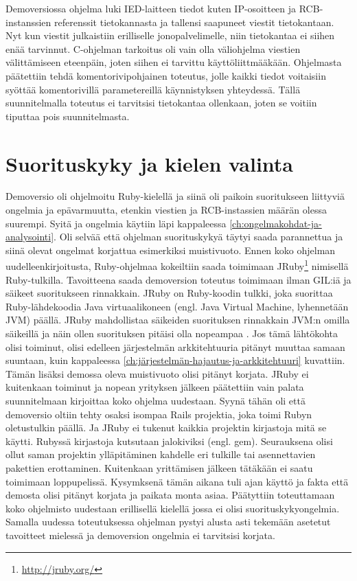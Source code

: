 Demoversiossa ohjelma luki IED-laitteen tiedot kuten IP-osoitteen ja RCB-instanssien referenssit tietokannasta ja tallensi saapuneet viestit tietokantaan. Nyt kun viestit julkaistiin erilliselle jonopalvelimelle, niin tietokantaa ei siihen enää tarvinnut. C-ohjelman tarkoitus oli vain olla väliohjelma viestien välittämiseen eteenpäin, joten siihen ei tarvittu käyttöliittmääkään. Ohjelmasta päätettiin tehdä komentorivipohjainen toteutus, jolle kaikki tiedot voitaisiin syöttää komentorivillä parametereillä käynnistyksen yhteydessä. Tällä suunnitelmalla toteutus ei tarvitsisi tietokantaa ollenkaan, joten se voitiin tiputtaa pois suunnitelmasta.


\section{Suorituskyky ja kielen valinta}
Demoversio oli ohjelmoitu Ruby-kielellä ja siinä oli paikoin suoritukseen liittyviä ongelmia ja epävarmuutta, etenkin viestien ja RCB-instassien määrän olessa suurempi. Syitä ja ongelmia käytiin läpi kappaleessa \ref{ch:ongelmakohdat-ja-analysointi}. Oli selvää että ohjelman suorituskykyä täytyi saada parannettua ja siinä olevat ongelmat korjattua esimerkiksi muistivuoto. Ennen koko ohjelman uudelleenkirjoitusta, Ruby-ohjelmaa kokeiltiin saada toimimaan JRuby\footnote{\url{http://jruby.org/}} nimisellä Ruby-tulkilla. Tavoitteena saada demoversion toteutus toimimaan ilman GIL:iä ja säikeet suoritukseen rinnakkain. JRuby on Ruby-koodin tulkki, joka suorittaa Ruby-lähdekoodia Java virtuaalikoneen (engl. Java Virtual Machine, lyhennetään JVM) päällä. JRuby mahdollistaa säikeiden suorituksen rinnakkain JVM:n omilla säikeillä ja näin ollen suorituksen pitäisi olla nopeampaa \cite{Youssef2013}. Jos tämä lähtökohta olisi toiminut, olisi edelleen järjestelmän arkkitehtuuria pitänyt muuttaa samaan suuntaan, kuin kappaleessa \ref{ch:järjestelmän-hajautus-ja-arkkitehtuuri} kuvattiin. Tämän lisäksi demossa oleva muistivuoto olisi pitänyt korjata. JRuby ei kuitenkaan toiminut ja nopean yrityksen jälkeen päätettiin vain palata suunnitelmaan kirjoittaa koko ohjelma uudestaan. Syynä tähän oli että demoversio oltiin tehty osaksi isompaa Rails projektia, joka toimi Rubyn oletustulkin päällä. Ja JRuby ei tukenut kaikkia projektin kirjastoja mitä se käytti. Rubyssä kirjastoja kutsutaan jalokiviksi (engl. gem). Seurauksena olisi ollut saman projektin ylläpitäminen kahdelle eri tulkille tai asennettavien pakettien erottaminen. Kuitenkaan yrittämisen jälkeen tätäkään ei saatu toimimaan loppupelissä. Kysymksenä tämän aikana tuli ajan käyttö ja fakta että demosta olisi pitänyt korjata ja paikata monta asiaa. Päätyttiin toteuttamaan koko ohjelmisto uudestaan erillisellä kielellä jossa ei olisi suorituskykyongelmia. Samalla uudessa toteutuksessa ohjelman pystyi alusta asti tekemään asetetut tavoitteet mielessä ja demoversion ongelmia ei tarvitsisi korjata.

